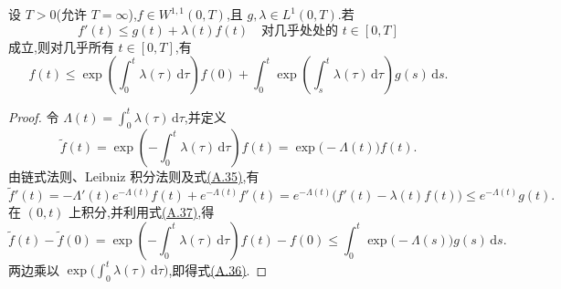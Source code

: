 \begin{lemma}\label{lem:appendix-a-54}
设 $T>0$(允许 $T=\infty$),$f\in W^{1,1}(0,T)$,且 $g,\lambda\in L^1(0,T)$.若
\begin{equation}\label{eq:appendix-a-35}
 f'(t)\le g(t)+\lambda(t)f(t)
 \quad\text{对几乎处处的 }t\in[0,T]
\end{equation}
成立,则对几乎所有 $t\in[0,T]$,有
\begin{equation}\label{eq:appendix-a-36}
 f(t)\le \exp\left(\int_0^t\lambda(\tau)\,\mathrm d\tau\right)f(0)
 +\int_0^t\exp\left(\int_s^t\lambda(\tau)\,\mathrm d\tau\right)g(s)\,\mathrm ds.
\end{equation}
\end{lemma}
\begin{proof}
令 $\Lambda(t)=\int_0^t\lambda(\tau)\,\mathrm d\tau$,并定义
\begin{equation}\label{eq:appendix-a-37}
 \widetilde f(t)=\exp\left(-\int_0^t\lambda(\tau)\,\mathrm d\tau\right)f(t)
 =\exp\bigl(-\Lambda(t)\bigr)f(t).
\end{equation}
由链式法则、Leibniz 积分法则及式\hyperref[eq:appendix-a-35]{(A.35)},有
\[
 \widetilde f'(t)=-\Lambda'(t)e^{-\Lambda(t)}f(t)+e^{-\Lambda(t)}f'(t)
 =e^{-\Lambda(t)}\bigl(f'(t)-\lambda(t)f(t)\bigr)
 \le e^{-\Lambda(t)}g(t).
\]
在 $(0,t)$ 上积分,并利用式\hyperref[eq:appendix-a-37]{(A.37)},得
\[
 \widetilde f(t)-\widetilde f(0)
 =\exp\left(-\int_0^t\lambda(\tau)\,\mathrm d\tau\right)f(t)-f(0)
 \le\int_0^t\exp\bigl(-\Lambda(s)\bigr)g(s)\,\mathrm ds.
\]
两边乘以 $\exp\bigl(\int_0^t\lambda(\tau)\,\mathrm d\tau\bigr)$,即得式\hyperref[eq:appendix-a-36]{(A.36)}.
\end{proof}

